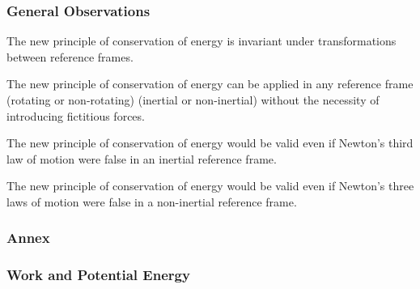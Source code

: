 \documentclass[10pt]{article}
\begin{document}
\vspace{+0.90em}

{\centering\subsubsection*{General Observations}}

\vspace{+0.90em}

\par The new principle of conservation of energy is invariant under transformations between reference frames.
\bigskip
\par The new principle of conservation of energy can be applied in any reference frame (rotating or non-rotating) (inertial or non-inertial) without the necessity of introducing fictitious forces.
\bigskip
\par The new principle of conservation of energy would be valid even if Newton's third law of motion were false in an inertial reference frame.
\bigskip
\par The new principle of conservation of energy would be valid even if Newton's three laws of motion were false in a non-inertial reference frame.

\newpage

{\centering\subsubsection*{Annex}}

\vspace{+0.90em}

{\centering\subsubsection*{Work and Potential Energy}}

\vspace{+0.90em}
\end{document}

